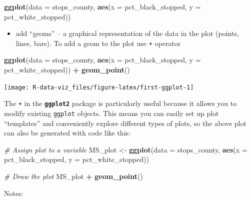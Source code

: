 \documentclass[]{book}
\newenvironment{Shaded}{\begin{snugshade}}{\end{snugshade}}
\newcommand{\KeywordTok}[1]{\textcolor[rgb]{0.13,0.29,0.53}{\textbf{#1}}}
\newcommand{\DataTypeTok}[1]{\textcolor[rgb]{0.13,0.29,0.53}{#1}}
\newcommand{\StringTok}[1]{\textcolor[rgb]{0.31,0.60,0.02}{#1}}
\newcommand{\CommentTok}[1]{\textcolor[rgb]{0.56,0.35,0.01}{\textit{#1}}}
\newcommand{\OperatorTok}[1]{\textcolor[rgb]{0.81,0.36,0.00}{\textbf{#1}}}
\newcommand{\NormalTok}[1]{#1}
\providecommand{\tightlist}{%
  \setlength{\itemsep}{0pt}\setlength{\parskip}{0pt}}
\theoremstyle{definition}
\theoremstyle{definition}
\theoremstyle{definition}
\theoremstyle{remark}
\begin{document}
\begin{Shaded}
\begin{Highlighting}[]
\KeywordTok{ggplot}\NormalTok{(}\DataTypeTok{data =}\NormalTok{ stops_county, }\KeywordTok{aes}\NormalTok{(}\DataTypeTok{x =}\NormalTok{ pct_black_stopped, }\DataTypeTok{y =}\NormalTok{ pct_white_stopped))}
\end{Highlighting}
\end{Shaded}

\begin{itemize}
\tightlist
\item
  add ``geoms'' -- a graphical representation of the data in the plot
  (points, lines, bars). To add a geom to the plot use \texttt{+}
  operator
\end{itemize}

\begin{Shaded}
\begin{Highlighting}[]
\KeywordTok{ggplot}\NormalTok{(}\DataTypeTok{data =}\NormalTok{ stops_county, }\KeywordTok{aes}\NormalTok{(}\DataTypeTok{x =}\NormalTok{ pct_black_stopped, }\DataTypeTok{y =}\NormalTok{ pct_white_stopped)) }\OperatorTok{+}
\StringTok{  }\KeywordTok{geom_point}\NormalTok{()}
\end{Highlighting}
\end{Shaded}

\texttt{[image: R-data-viz\_files/figure-latex/first-ggplot-1]}

The \texttt{+} in the \textbf{\texttt{ggplot2}} package is particularly
useful because it allows you to modify existing \texttt{ggplot} objects.
This means you can easily set up plot ``templates'' and conveniently
explore different types of plots, so the above plot can also be
generated with code like this:

\begin{Shaded}
\begin{Highlighting}[]
\CommentTok{# Assign plot to a variable}
\NormalTok{MS_plot <-}\StringTok{ }\KeywordTok{ggplot}\NormalTok{(}\DataTypeTok{data =}\NormalTok{ stops_county, }\KeywordTok{aes}\NormalTok{(}\DataTypeTok{x =}\NormalTok{ pct_black_stopped, }\DataTypeTok{y =}\NormalTok{ pct_white_stopped))}

\CommentTok{# Draw the plot}
\NormalTok{MS_plot }\OperatorTok{+}\StringTok{ }\KeywordTok{geom_point}\NormalTok{()}
\end{Highlighting}
\end{Shaded}

Notes:
\end{document}
